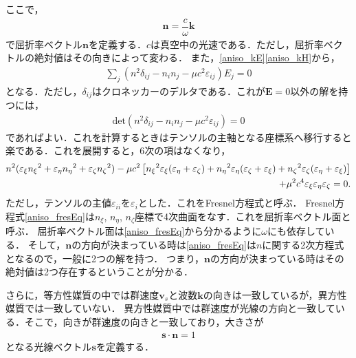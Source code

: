 ここで，
\begin{align}
  \boldsymbol{n}=\dfrac{c}{\omega}\boldsymbol{k}\label{aniso_nvec}
\end{align}
で屈折率ベクトル$\boldsymbol{n}$を定義する．$c$は真空中の光速である．ただし，屈折率ベクトルの絶対値はその向きによって変わる．
また，\eqref{aniso_kE}\eqref{aniso_kH}から，
\begin{align}
  \sum_j(n^2\delta_{ij}-n_i{}n_j-\mu{}c^2\varepsilon_{ij})E_j=0\label{aniso_fresE}
\end{align}
となる．ただし，$\delta_{ij}$はクロネッカーのデルタである．これが$\boldsymbol{E}=0$以外の解を持つには，
\begin{align}
  \text{det}(n^2\delta_{ij}-n_i{}n_j-\mu{}c^2\varepsilon_{ij})=0
\end{align}
であればよい．これを計算するときはテンソルの主軸となる座標系へ移行すると楽である．これを展開すると，6次の項はなくなり，
\begin{align}
  n^2(\varepsilon_{\xi}{n_\xi}^2+\varepsilon_{\eta}{n_\eta}^2+\varepsilon_{\zeta}{n_\zeta}^2)
  -\mu{c}^2\left[{n_\xi}^2\varepsilon_\xi(\varepsilon_\eta+\varepsilon_\zeta)
  +{n_\eta}^2\varepsilon_\eta(\varepsilon_\zeta+\varepsilon_\xi)
  +{n_\zeta}^2\varepsilon_\zeta(\varepsilon_\eta+\varepsilon_\xi)\right] \notag \\
  +\mu^2{c}^4\varepsilon_\xi\varepsilon_\eta\varepsilon_\zeta = 0 . \label{aniso_fresEq}
\end{align}
ただし，テンソルの主値$\varepsilon_{ii}$を$\varepsilon_{i}$とした．これをFresnel方程式と呼ぶ．
Fresnel方程式\eqref{aniso_fresEq}は$n_\xi$, $n_\eta$, $n_\zeta$座標で4次曲面をなす．これを屈折率ベクトル面と呼ぶ．
屈折率ベクトル面は\eqref{aniso_fresEq}から分かるように$\omega$にも依存している．
そして，$\boldsymbol{n}$の方向が決まっている時は\eqref{aniso_fresEq}は$n$に関する2次方程式となるので，一般に2つの解を持つ．
つまり，$\boldsymbol{n}$の方向が決まっている時はその絶対値は2つ存在するということが分かる．

さらに，等方性媒質の中では群速度$\boldsymbol{v}_s$と波数$\boldsymbol{k}$の向きは一致しているが，異方性媒質では一致していない．
異方性媒質中では群速度が光線の方向と一致している．そこで，向きが群速度の向きと一致しており，大きさが
\begin{align}
  \boldsymbol{s}\cdot\boldsymbol{n}=1 \label{aniso_def_s}
\end{align}
となる光線ベクトル$\boldsymbol{s}$を定義する．

